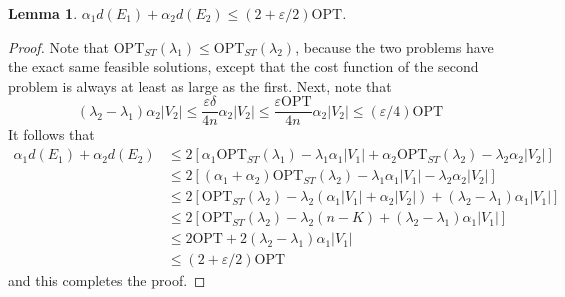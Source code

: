 \documentclass{article}
\theoremstyle{plain}
\newtheorem{lemma}{Lemma}
\theoremstyle{plain}
\begin{document}
\begin{lemma}
    $\alpha_1 d(E_1) + \alpha_2 d(E_2) \leq (2 + \varepsilon/2) \text{OPT}$.
\end{lemma}
\begin{proof}
    Note that $\text{OPT}_{ST}(\lambda_1) \leq \text{OPT}_{ST}(\lambda_2)$, because the two problems have the exact same feasible solutions, except that the cost function of the second problem is always at least as large as the first. Next, note that
    \[ (\lambda_2 - \lambda_1) \alpha_2 |V_2| \leq \frac{\varepsilon \delta}{4 n} \alpha_2 |V_2| \leq \frac{\varepsilon \text{OPT}}{4n} \alpha_2 |V_2| \leq (\varepsilon/4) \text{OPT} \]
    It follows that
    \begin{align*}
        \alpha_1 d(E_1) + \alpha_2 d(E_2) &\leq 2[\alpha_1 \text{OPT}_{ST}(\lambda_1) - \lambda_1 \alpha_1 |V_1| + \alpha_2 \text{OPT}_{ST}(\lambda_2) - \lambda_2 \alpha_2 |V_2|]\\
        &\leq 2[(\alpha_1 + \alpha_2) \text{OPT}_{ST}(\lambda_2) - \lambda_1 \alpha_1 |V_1| - \lambda_2 \alpha_2 |V_2|]\\
        &\leq 2[\text{OPT}_{ST}(\lambda_2) - \lambda_2(\alpha_1 |V_1| + \alpha_2 |V_2|) + (\lambda_2 - \lambda_1) \alpha_1 |V_1|]\\
        &\leq 2[ \text{OPT}_{ST}(\lambda_2) - \lambda_2(n-K) + (\lambda_2 - \lambda_1) \alpha_1 |V_1|]\\
        &\leq 2 \text{OPT} + 2 (\lambda_2 - \lambda_1) \alpha_1 |V_1|\\
        &\leq (2 + \varepsilon/2) \text{OPT}
    \end{align*}
    and this completes the proof.
\end{proof}
\end{document}
